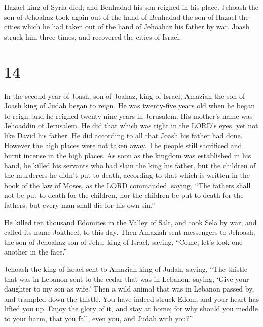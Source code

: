  Hazael king of Syria died; and Benhadad his son reigned in
his place.  Jehoash the son of Jehoahaz took again out of
the hand of Benhadad the son of Hazael the cities which he had taken out
of the hand of Jehoahaz his father by war. Joash struck him three times,
and recovered the cities of Israel.

\hypertarget{section-13}{%
\section{14}\label{section-13}}

 In the second year of Joash, son of Joahaz, king of Israel,
Amaziah the son of Joash king of Judah began to reign.  He
was twenty-five years old when he began to reign; and he reigned
twenty-nine years in Jerusalem. His mother's name was Jehoaddin of
Jerusalem.  He did that which was right in the LORD's eyes,
yet not like David his father. He did according to all that Joash his
father had done.  However the high places were not taken
away. The people still sacrificed and burnt incense in the high places.
 As soon as the kingdom was established in his hand, he
killed his servants who had slain the king his father,  but
the children of the murderers he didn't put to death, according to that
which is written in the book of the law of Moses, as the LORD commanded,
saying, ``The fathers shall not be put to death for the children, nor
the children be put to death for the fathers; but every man shall die
for his own sin.''

 He killed ten thousand Edomites in the Valley of Salt, and
took Sela by war, and called its name Joktheel, to this day.
 Then Amaziah sent messengers to Jehoash, the son of
Jehoahaz son of Jehu, king of Israel, saying, ``Come, let's look one
another in the face.''

 Jehoash the king of Israel sent to Amaziah king of Judah,
saying, ``The thistle that was in Lebanon sent to the cedar that was in
Lebanon, saying, `Give your daughter to my son as wife.' Then a wild
animal that was in Lebanon passed by, and trampled down the thistle.
 You have indeed struck Edom, and your heart has lifted you
up. Enjoy the glory of it, and stay at home; for why should you meddle
to your harm, that you fall, even you, and Judah with you?''

